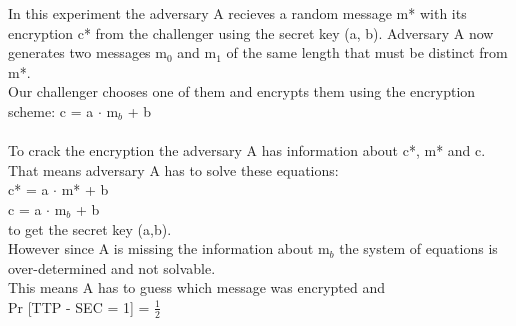 In this experiment the adversary A recieves a random message m* with its encryption c* from the challenger using the secret key (a, b). Adversary A now generates two messages m\(_{0}\) and m\(_{1}\) of the same length that must be distinct from m*. \\
Our challenger chooses one of them and encrypts them using the encryption scheme:
c = a  \(\cdot\) m\(_{b}\) + b \\
\\
To crack the encryption the adversary A has information about c*, m* and c. \\
That means adversary A has to solve these equations: \\
c* = a  \(\cdot\) m* + b \\
c = a  \(\cdot\) m\(_{b}\) + b \\
to get the secret key (a,b).\\
However since A is missing the information about m\(_{b}\) the system of equations is over-determined and not solvable. \\
This means A has to guess which message was encrypted and \\
Pr [TTP - SEC = 1] = \(\frac{1}{2}\) \\

